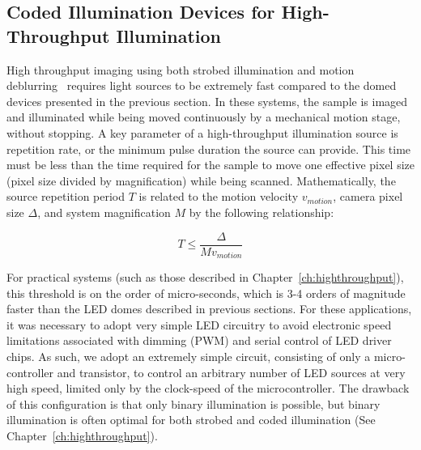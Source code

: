 \subsection{Coded Illumination Devices for High-Throughput Illumination}\label{sec:fabrication:highthroughput}

High throughput imaging using both strobed illumination and motion deblurring~\cite{raskar2006coded} requires light sources to be extremely fast compared to the domed devices presented in the previous section. In these systems, the sample is imaged and illuminated while being moved continuously by a mechanical motion stage, without stopping. A key parameter of a high-throughput illumination source is repetition rate, or the minimum pulse duration the source can provide. This time must be less than the time required for the sample to move one effective pixel size (pixel size divided by magnification) while being scanned. Mathematically, the source repetition period $T$ is related to the motion velocity $v_{motion}$, camera pixel size $\Delta$, and system magnification $M$ by the following relationship:

\begin{equation}
    T \leq \frac{\Delta}{Mv_{motion}}
\end{equation}

For practical systems (such as those described in Chapter~\ref{ch:highthroughput}), this threshold is on the order of micro-seconds, which is 3-4 orders of magnitude faster than the LED domes described in previous sections. For these applications, it was necessary to adopt very simple LED circuitry to avoid electronic speed limitations associated with dimming (PWM) and serial control of LED driver chips. As such, we adopt an extremely simple circuit, consisting of only a micro-controller and transistor, to control an arbitrary number of LED sources at very high speed, limited only by the clock-speed of the microcontroller. The drawback of this configuration is that only binary illumination is possible, but binary illumination is often optimal for both strobed and coded illumination (See Chapter~\ref{ch:highthroughput}).


